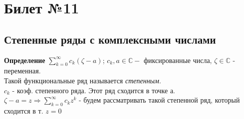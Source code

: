 \documentclass[a4paper,12pt]{article} %
\begin{document}
	\section*{Билет №11}
	\subsection*{Степенные ряды с комплексными числами}
	\noindent\textbf{Определение} $\sum\limits_{k = 0}^\infty c_k(\zeta - a)$; $c_k, a \in \mathbb{C} -$ фиксированные числа, $\zeta \in \mathbb{C}$  - переменная. \\
	Такой функциональные ряд называется \textit{степенным}.\\
	$c_k$ - коэф. степенного ряда. Этот ряд сходится в точке а.\\
	$\zeta - a = z \Rightarrow \sum\limits_{k = 0}^\infty c_k z^k$ - будем рассматривать такой степенной ряд, который сходится в т. $z = 0$ \\
\end{document}
